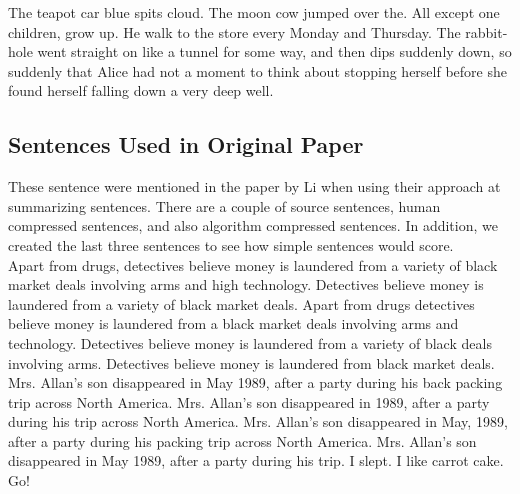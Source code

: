 \documentclass[11pt,a4paper]{article}
\begin{document}
The teapot car blue spits cloud.
The moon cow jumped over the.
All except one children, grow up.
He walk to the store every Monday and Thursday.
The rabbit-hole went straight on like a tunnel for some way, and then
dips suddenly down, so suddenly that Alice had not a moment to think
about stopping herself before she found herself falling down a very deep
well.

\subsection{Sentences Used in Original Paper \cite{li2014}}
These sentence were mentioned in the paper by Li \cite{li2014} when using their approach at summarizing sentences. There are a couple of source sentences, human compressed sentences, and also algorithm compressed sentences. In addition, we created the last three sentences to see how simple sentences would score.\\

Apart from drugs, detectives believe money is laundered from a variety of black market deals involving arms and high technology.
Detectives believe money is laundered from a variety of black market deals.
Apart from drugs detectives believe money is laundered from a black market deals involving arms and technology.
Detectives believe money is laundered from a variety of black deals involving arms.
Detectives believe money is laundered from black market deals.
Mrs. Allan's son disappeared in May 1989, after a party during his back packing trip across North America.
Mrs. Allan's son disappeared in 1989, after a party during his trip across North America.
Mrs. Allan's son disappeared in May, 1989, after a party during his packing trip across North America.
Mrs. Allan's son disappeared in May 1989, after a party during his trip.
I slept.
I like carrot cake.
Go!
\end{document}
